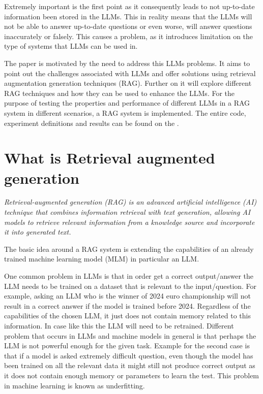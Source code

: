\documentclass{wseas}
\begin{document}
Extremely important is the first point as it consequently leads to
not up-to-date information been stored in the LLMs. This in reality means that
the LLMs will not be able to answer up-to-date questions or even worse, will
answer questions inaccurately or falsely. This causes a problem, as it 
introduces limitation on the type of systems that LLMs can be used in.

The paper is motivated by the need to address this LLMs problems.
It aims to point out the challenges associated with LLMs and offer solutions
using retrieval augmentation generation techniques (RAG). 
Further on it will explore different RAG techniques and how they can be used  
to enhance the LLMs. For the purpose of testing the properties and performance 
of different LLMs in a RAG system in different scenarios, a RAG system is implemented. 
The entire code, experiment definitions and results can be found on the 
\cite{cite_github_solution}.

\section{What is Retrieval augmented generation}

\emph{Retrieval-augmented generation (RAG) is an advanced
 artificial intelligence (AI) technique that combines information 
 retrieval with text generation, allowing AI models to retrieve 
 relevant information from a knowledge source and incorporate it 
 into generated text.}\cite{website_deffinition_rag}


The basic idea around a RAG system is extending the capabilities of an
already trained machine learning model (MLM) in particular an LLM.

One common problem in LLMs is that in order get a correct output/answer
the LLM needs to be trained on a dataset that is relevant to the
input/question. For example, asking an LLM who is the winner of 2024
euro championship will not result in a correct answer if the model is
trained before 2024. Regardless of the capabilities of the chosen LLM,
it just does not contain memory related to this information. In case
like this the LLM will need to be retrained. Different problem that
occurs in LLMs and machine models in general is that perhaps the LLM is
not powerful enough for the given task. Example for the second case is
that if a model is asked extremely difficult question, even though the
model has been trained on all the relevant data it might still not
produce correct output as it does not contain enough memory or parameters
to learn the test. This problem in machine learning is known as underfitting.
\end{document}
